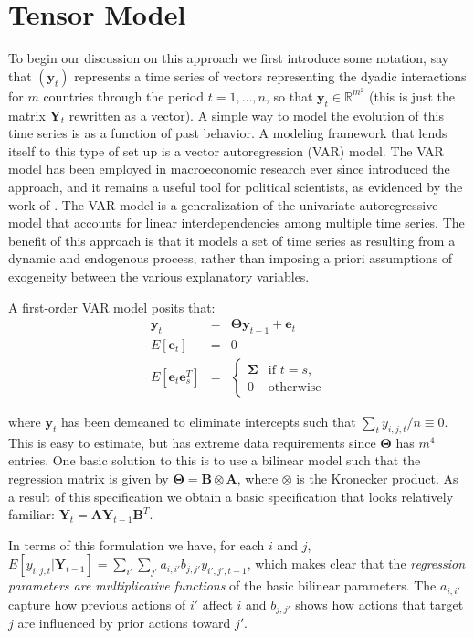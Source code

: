 \documentclass[3p,times,twocolumn,authoryear,12pt]{elsarticle}
\newcommand{\bl}[1]{{\mathbf #1}}
\begin{document}
\section{Tensor Model}

To begin our discussion on this approach we first introduce some notation, say that $(\mathbf y_t)$ represents a time series of vectors representing the dyadic interactions for $m$ countries through the period $t = 1, \ldots, n$, so that $\mathbf y_t \in \mathbb{R}^{m^2}$ (this is just the matrix $\bl Y_t$ rewritten as a vector). A simple way to model the evolution of this time series is as a function of past behavior. A modeling framework that lends itself to this type of set up is a vector autoregression (VAR) model. The VAR model has been employed in macroeconomic research ever since \citet{sims:1980} introduced the approach, and it remains a useful tool for political scientists, as evidenced by the work of \citet{brandt:freeman:2006, davies:2014, tahk:2015}. The VAR model is a generalization of the univariate autoregressive model that accounts for linear interdependencies among multiple time series. The benefit of this approach is that it models a set of time series as resulting from a dynamic and endogenous process, rather than imposing a priori assumptions of exogeneity between the various explanatory variables. 

A first-order VAR model posits that:
\begin{eqnarray}
	\bl y_t &=& { \bl \Theta \bl y_{t-1} +\bl e_t}\\
	E[\bl e_t] &=& 0 \\
	E[\bl e_t \bl e^T_s] &=& \begin{cases}  \bl \Sigma &\mbox{if } t=s, \\ 0 &\mbox{otherwise}\end{cases}
\end{eqnarray}

\noindent where $\bl y_t$ has been demeaned to eliminate intercepts such that $\sum_t y_{i,j,t}/n \equiv 0$. This is easy to estimate, but has extreme data requirements since $\bl \Theta$ has $m^4$ entries. One basic solution to this is to use a bilinear model such that the regression matrix is given by $\bl \Theta = \bl B \otimes \bl A$, where $\otimes$ is the Kronecker product. As a result of this specification we obtain a basic specification that looks relatively familiar: $\bl Y_t = \bl A\bl Y_{t-1}\bl B^T$. 

In terms of this formulation we have, for each $i$ and $j$, $E[y_{i,j,t}| \bl Y_{t-1}] = \sum_{i'} \sum_{j'} a_{i,i'} b_{j,j'} y_{i',j',t-1}$, which makes clear that the {\em regression parameters are multiplicative functions} of the basic bilinear parameters. The $a_{i,i'}$ capture how previous actions of $i'$ affect $i$ and $b_{j,j'}$ shows how actions that target $j$ are influenced by prior actions toward $j'$.
\end{document}

